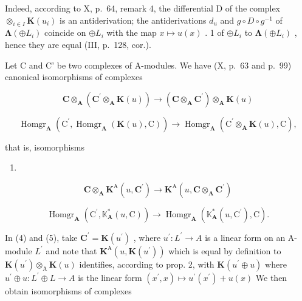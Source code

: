 Indeed, according to X, p.~64, remark 4, the differential D of the complex \(\otimes_{i\in I}\mathbf{K}(u_i)\) is an antiderivation; the antiderivations \(d_u\) and \(g\circ D\circ g^{-1}\) of \(\boldsymbol{\Lambda}(\oplus L_i)\) coincide on \(\oplus L_i\) with the map \(x\mapsto u(x)\) . 1 of \(\oplus L_i\) to \(\boldsymbol{\Lambda}(\oplus L_i)\) , hence they are equal (III, p.~128, cor.).

Let C and C' be two complexes of A-modules. We have (X, p.~63 and p.~99) canonical isomorphisms of complexes

\[
\mathbf {C} \otimes_ {\mathbf {A}} \left(\mathbf {C} ^ {\prime} \otimes_ {\mathbf {A}} \mathbf {K} (u)\right)\rightarrow \left(\mathbf {C} \otimes_ {\mathbf {A}} \mathbf {C} ^ {\prime}\right) \otimes_ {\mathbf {A}} \mathbf {K} (u)
\]

\[
\operatorname{Homgr} _ {\mathbf {A}} \left(\mathrm{C} ^ {\prime}, \operatorname{Homgr} _ {\mathbf {A}} (\mathbf {K} (u), \mathrm{C})\right)\rightarrow \operatorname{Homgr} _ {\mathbf {A}} \left(\mathrm{C} ^ {\prime} \otimes_ {\mathbf {A}} \mathbf {K} (u), \mathrm{C}\right),
\]

that is, isomorphisms

\begin{enumerate}
\def\labelenumi{(\arabic{enumi})}
\setcounter{enumi}{3}
\tightlist
\item
\end{enumerate}

\[
\mathbf {C} \otimes_ {\mathbf {A}} \mathbf {K} ^ {\mathrm{A}} (u, \mathbf {C} ^ {\prime}) \rightarrow \mathbf {K} ^ {\mathrm{A}} (u, \mathbf {C} \otimes_ {\mathbf {A}} \mathbf {C} ^ {\prime})\tag{5}
\]

\[
\operatorname{Homgr} _ {\mathbf {A}} \left(\mathrm{C} ^ {\prime}, \mathbb {K} _ {\mathbf {A}} ^ {*} (u, \mathrm{C})\right)\rightarrow \operatorname{Homgr} _ {\mathbf {A}} \left(\mathbb {K} _ {\mathbf {A}} ^ {*} (u, \mathrm{C} ^ {\prime}), \mathrm{C}\right).
\]

In (4) and (5), take \(\mathbf{C}^{\prime} = \mathbf{K}(u^{\prime})\) , where \(u^{\prime}: L^{\prime} \to A\) is a linear form on an A-module \(L^{\prime}\) and note that \(\mathbf{K}^{\mathrm{A}}(u, \mathbf{K}(u^{\prime}))\) which is equal by definition to \(\mathbf{K}(u^{\prime}) \otimes_{\mathrm{A}} \mathbf{K}(u)\) identifies, according to prop. 2, with \(\mathbf{K}(u^{\prime} \oplus u)\) where \(u^{\prime} \oplus u: L^{\prime} \oplus L \to A\) is the linear form \((x^{\prime}, x) \mapsto u^{\prime}(x^{\prime}) + u(x)\) We then obtain isomorphisms of complexes

